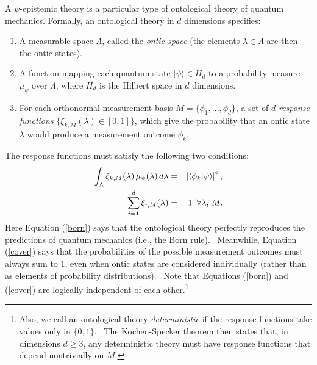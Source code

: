 \documentclass[letterpaper,11pt]{article}
\newcommand{\ba}{\begin{eqnarray}}
\newcommand{\ea}{\end{eqnarray}}
\newcommand{\braket}[2]{\mbox{$ \langle #1 | #2 \rangle $}}
\begin{document}
A $\psi$-epistemic theory is a particular type of ontological theory of quantum mechanics. Formally, an ontological theory in $d$ dimensions specifies:

\begin{enumerate}
\item A measurable space $\Lambda$, called the \emph{ontic space} (the
elements $\lambda \in \Lambda$ are then the ontic states).

\item A function mapping each quantum state $ | \psi \rangle \in H_d
$ to a probability measure $\mu_\psi$ over $\Lambda$, where $H_d$ is the
Hilbert space in $d$ dimensions.

\item For each orthonormal measurement basis $M=\{\phi_1,\ldots,\phi_d\}$, a
set of $d$ \emph{response functions} $\{\xi_{k,M}(\lambda) \in [0,1]\}$,
which give the probability that an ontic state $\lambda$ would produce a
measurement outcome $\phi_k$.
\end{enumerate}

The response functions
must satisfy the following two conditions:
\ba \int_\Lambda \xi_{k,M}(\lambda)\,\mu_\psi(\lambda)\,d\lambda &=& |\braket{\phi_k}{\psi}|^2\,, \label{born} \\
\sum_{i=1}^{d} \xi_{i,M}(\lambda) &=& 1\,\,\, \forall \lambda,\, M. \label{cover} \ea
Here Equation (\ref{born}) says that the ontological theory perfectly reproduces the predictions of quantum
mechanics (i.e., the Born rule). \ Meanwhile, Equation (\ref{cover}) says that the probabilities of the
possible measurement outcomes must always sum to $1$, even when ontic states
are considered individually (rather than as elements of probability
distributions). \ Note that Equations (\ref{born}) and (\ref{cover}) are
logically independent of each other.\footnote{Also, we call an ontological theory \textit{deterministic} if the response functions take values
only in $\{0,1\}$. \ The Kochen-Specker theorem then states that, in
dimensions $d \geq 3$, any deterministic theory must have response functions
that depend nontrivially on $M$.}
\end{document}
